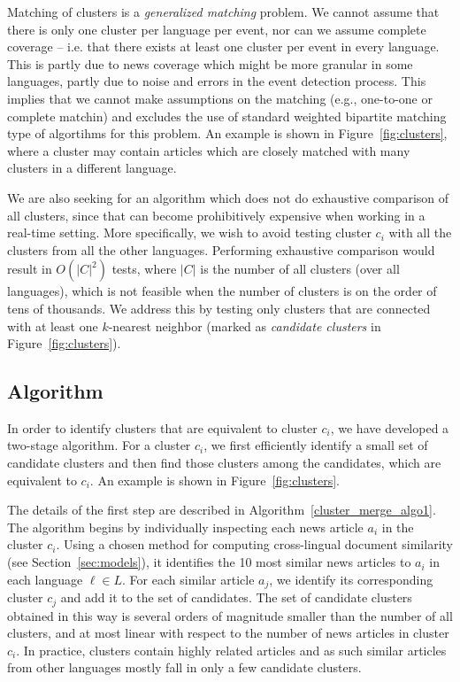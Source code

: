 \documentclass[twoside,11pt]{article}
\begin{document}
Matching of clusters is a \emph{generalized matching} problem. We cannot assume that there is only one cluster per language per event, nor can we assume complete coverage -- i.e. that there exists at least one cluster per event in every language. This is partly due to news coverage which might be more granular in some languages, partly due to noise and errors in the event detection process. This implies that we cannot make assumptions on the matching (e.g., one-to-one or complete matchin) and excludes the use of standard weighted bipartite matching type of algortihms for this problem. An example is shown in Figure~\ref{fig:clusters}, where a cluster may contain articles which are closely matched with many clusters in a different language.

We are also seeking for an algorithm which does not do exhaustive comparison of all clusters, since that can become prohibitively expensive when working in a real-time setting. More specifically, we wish to avoid testing cluster $c_i$ with all the clusters from all the other languages. Performing exhaustive comparison would result in $O(|C|^2)$ tests, where $|C|$ is the number of all clusters (over all languages), which is not feasible when the number of clusters is on the order of tens of thousands. We address this by testing only clusters that are connected with at least one $k$-nearest neighbor (marked as \emph{candidate clusters} in Figure~\ref{fig:clusters}).

\subsection{Algorithm}

In order to identify clusters that are equivalent to cluster $c_i$, we have developed a two-stage algorithm. For a cluster $c_i$, we first efficiently identify a small set of candidate clusters and then find those clusters among the candidates, which are equivalent to $c_i$. An example is  shown in  Figure~\ref{fig:clusters}.

The details of the first step are described in Algorithm~\ref{cluster_merge_algo1}. The algorithm begins by individually inspecting each news article $a_i$ in the cluster $c_i$. Using a chosen method for computing cross-lingual document similarity (see Section~\ref{sec:models}), it identifies the 10 most similar news articles to $a_i$ in each language $\ell \in L$. For each similar article $a_j$, we identify its corresponding  cluster $c_j$ and add it to the set of candidates. The set of candidate clusters obtained in this way is several orders of magnitude smaller than the number of all clusters, and at most linear with respect to the number of news articles in cluster $c_i$. In practice, clusters contain highly related articles and as such similar articles from other languages mostly fall in only a few candidate clusters.
\end{document}

